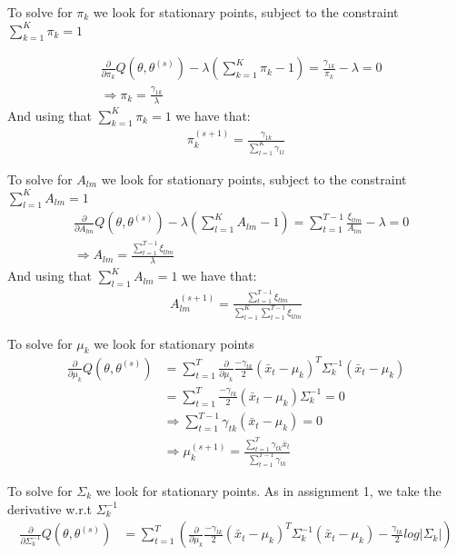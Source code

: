 \documentclass[paper=a4, fontsize=11pt]{scrartcl} %
\numberwithin{equation}{section} %
\numberwithin{figure}{section} %
\numberwithin{table}{section} %
\begin{document}
To solve for \(\pi_k\) we look for stationary points, subject to the constraint \(\sum_{k=1}^K\pi_k = 1\)

\begin{align}
&\frac{\partial}{\partial\pi_k} Q(\theta, \theta^{(s)}) - \lambda \left(\sum_{k=1}^K\pi_k - 1 \right) = \frac{\gamma_{1k}}{\pi_k}-\lambda = 0\\
&\Rightarrow \pi_k = \frac{\gamma_{1k}}{\lambda}
\end{align}
And using that \(\sum_{k=1}^K\pi_k = 1\) we have that:
\begin{align}
\pi_k^{(s+1)} = \frac{\gamma_{1k}}{\sum_{l=1}^K\gamma_{1l}}
\end{align}

To solve for \(A_{lm}\) we look for stationary points, subject to the constraint \(\sum_{l=1}^K A_{lm} = 1\)
\begin{align}
&\frac{\partial}{\partial A_{lm}} Q(\theta, \theta^{(s)}) - \lambda \left(\sum_{l=1}^K A_{lm} - 1 \right) = \sum_{t=1}^{T-1}\frac{\xi_{tlm}}{A_{lm}}-\lambda = 0\\
&\Rightarrow A_{lm} = \frac{\sum_{t=1}^{T-1}\xi_{tlm}}{\lambda}
\end{align}
And using that \(\sum_{l=1}^K A_{lm} = 1\) we have that:
\begin{align}
A_{lm}^{(s+1)} = \frac{\sum_{t=1}^{T-1}\xi_{tlm}}{\sum_{l=1}^K\sum_{t=1}^{T-1}\xi_{tlm}}
\end{align}

To solve for \(\mu_k\) we look for stationary points
\begin{align}
\frac{\partial}{\partial \mu_{k}} Q(\theta, \theta^{(s)}) &= \sum_{t=1}^{T}\frac{\partial}{\partial \mu_{k}}\frac{-\gamma_{tk}}{2}(\bar{x}_t-\mu_k)^T\Sigma_k^{-1}(\bar{x}_t-\mu_k) \\
&=\sum_{t=1}^{T}\frac{-\gamma_{tk}}{2}(\bar{x}_t-\mu_k)\Sigma_k^{-1}=0\\
&\Rightarrow \sum_{t=1}^{T-1}\gamma_{tk}(\bar{x}_t-\mu_k)=0\\
&\Rightarrow \mu_k^{(s+1)} = \frac{\sum_{t=1}^{T}\gamma_{tk}\bar{x}_t}{\sum_{t=1}^{T-1}\gamma_{tk}}
\end{align}

To solve for \(\Sigma_k\) we look for stationary points. As in assignment 1, we take the derivative w.r.t \(\Sigma^{-1}_k\)
\begin{align}
\frac{\partial}{\partial \Sigma^{-1}_{k}} Q(\theta, \theta^{(s)}) &= \sum_{t=1}^{T}\left(\frac{\partial}{\partial \mu_{k}}\frac{-\gamma_{tk}}{2}(\bar{x}_t-\mu_k)^T\Sigma_k^{-1}(\bar{x}_t-\mu_k)-\frac{\gamma_{tk}}{2}log|\Sigma_k|\right) \\
\end{align}
\end{document}
